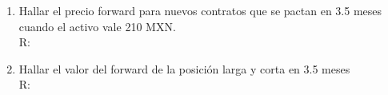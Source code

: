\documentclass[12pt,a4paper]{article}
\begin{document}
\begin{enumerate}
\begin{enumerate}
   \item Hallar el precio forward para nuevos contratos que se pactan en 3.5 meses cuando el activo vale 210 MXN.\\
   	\textcolor{borungy}{R:}\\

	\item Hallar el valor del forward de la posición larga  y corta en 3.5 meses\\
	\textcolor{borungy}{R:}\\

   \end{enumerate}
\end{enumerate}
\end{document}
